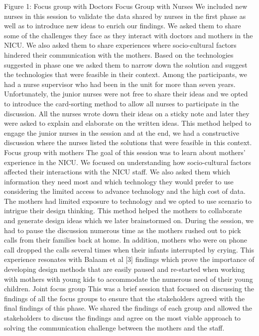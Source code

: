                                     Figure 1: Focus group with Doctors
Focus Group with Nurses
We included new nurses in this session to validate the data shared by nurses in the first phase as well as to introduce new ideas to enrich our findings. We asked them to share some of the challenges they face as they interact with doctors and mothers in the NICU. We also asked them to share experiences where socio-cultural factors hindered their communication with the mothers. Based on the technologies suggested in phase one we asked them to narrow down the solution and suggest the technologies that were feasible in their context. 
Among the participants, we had a nurse supervisor who had been in the unit for more than seven years. Unfortunately, the junior nurses were not free to share their ideas and we opted to introduce the card-sorting method to allow all nurses to participate in the discussion. All the nurses wrote down their ideas on a sticky note and later they were asked to explain and elaborate on the written ideas. This method helped to engage the junior nurses in the session and at the end, we had a constructive discussion where the nurses listed the solutions that were feasible in this context. 
Focus group with mothers
The goal of this session was to learn about mothers’ experience in the NICU. We focused on understanding how socio-cultural factors affected their interactions with the NICU staff. We also asked them which information they need most and which technology they would prefer to use considering the limited access to advance technology and the high cost of data. The mothers had limited exposure to technology and we opted to use scenario to intrigue their design thinking. This method helped the mothers to collaborate and generate design ideas which we later brainstormed on.
During the session, we had to pause the discussion numerous time as the mothers rushed out to pick calls from their families back at home. In addition, mothers who were on phone call dropped the calls several times when their infants interrupted by crying. This experience resonates with Balaam et al [3] findings which prove the importance of developing design methods that are easily paused and re-started when working with mothers with young kids to accommodate the numerous need of their young children.
Joint focus group
This was a brief session that focused on discussing the findings of all the focus groups to ensure that the stakeholders agreed with the final findings of this phase. We shared the findings of each group and allowed the stakeholders to discuss the findings and agree on the most viable approach to solving the communication challenge between the mothers and the staff.

